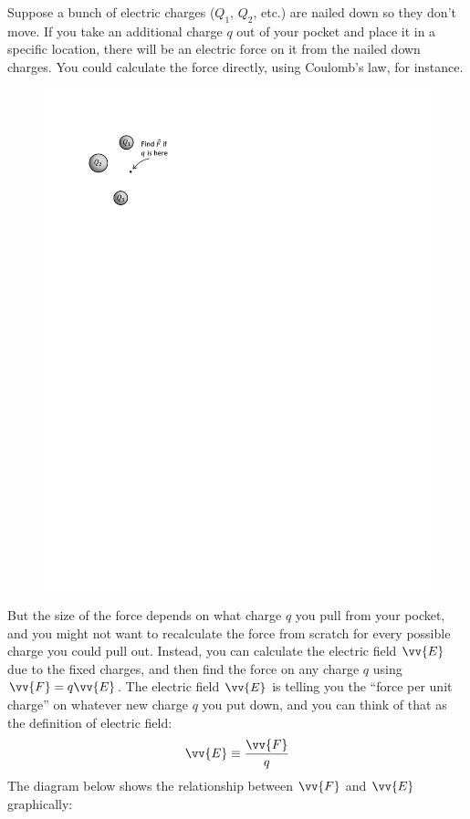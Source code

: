 Suppose a bunch of electric charges ($Q_1$, $Q_2$, etc.) are nailed down so they don't move.  If you take an additional charge $q$ out of your pocket and place it in a specific location, there will be an electric force on it from the nailed down charges.  You could calculate the force directly, using Coulomb's law, for instance.  
\begin{figure}
\begin{center}
\vspace{-0.3 in}
\includegraphics[scale=0.8]{potential_intro/activity_3_figs/charge_from_pocket.pdf}
\end{center}
\end{figure}


But the size of the force depends on what charge $q$ you pull from your pocket, and you might not want to recalculate the force from scratch for every possible charge you could pull out.  Instead, you can calculate the electric field $\vv{E}$ due to the fixed charges, and then find the force on any charge $q$ using $\vv{F}=q\vv{E}$.  The electric field $\vv{E}$ is telling you the ``force per unit charge'' on whatever new charge $q$ you put down, and you can think of that as the definition of electric field:
$$\vv{E} \equiv \frac{\vv{F}}{q}$$
The diagram below shows the relationship between $\vv{F}$ and $\vv{E}$ graphically:

